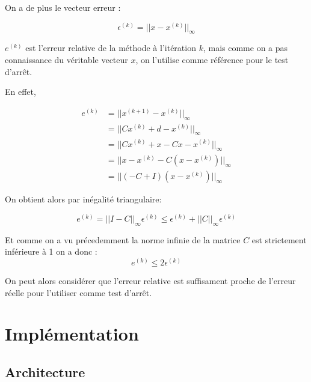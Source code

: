 \documentclass[11pt, a4paper]{article}
\begin{document}
On a de plus le vecteur erreur :

\[
\epsilon^{(k)} = ||x - x^{(k)}||_{\infty}
\]

$e^{(k)}$ est l'erreur relative de la méthode à l'itération $k$, mais comme on a pas connaissance du véritable vecteur $x$, on l'utilise comme référence pour le test d'arr\^et.

En effet, 

\begin{align}
    e^{(k)} &= ||x^{(k+1)} - x^{(k)}||_{\infty}\\
    &= ||Cx^{(k)} + d - x^{(k)}||_{\infty}\\
    &= ||Cx^{(k)} + x - Cx - x^{(k)}||_{\infty}\\
    &= ||x - x^{(k)} - C(x - x^{(k)})||_{\infty}\\
    &= ||(-C + I)(x - x^{(k)})||_{\infty}
\end{align}

On obtient alors par inégalité triangulaire: 

\[
e^{(k)} = ||I - C||_{\infty}\epsilon^{(k)} \leq \epsilon^{(k)} + ||C||_{\infty}\epsilon^{(k)}
\]

Et comme on a vu précedemment la norme infinie de la matrice $C$ est strictement inférieure à 1 on a donc :
\[
e^{(k)} \leq 2\epsilon^{(k)}
\]

On peut alors considérer que l'erreur relative est suffisament proche de l'erreur réelle pour l'utiliser comme test d'arr\^et.

\newpage

\section{Implémentation}

\subsection{Architecture}
\end{document}
